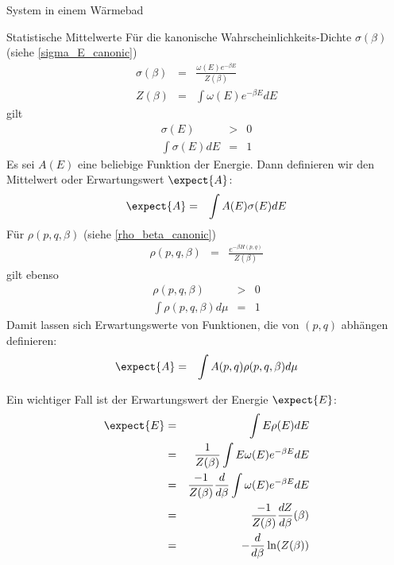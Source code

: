 \begin{chapter}{\titlestr}
\begin{section}{System in einem Wärmebad}
\begin{subsection}{Statistische Mittelwerte}
Für die kanonische Wahrscheinlichkeits-Dichte $\sigma(\beta)$ (siehe \ref{sigma_E_canonic})
\begin{eqnarray*}
\sigma(\beta)&=& \frac{\omega(E)e^{-\beta E}}{Z(\beta)}\\
Z(\beta) &=& \int\omega(E)e^{-\beta E}dE
\end{eqnarray*}
gilt
\begin{eqnarray*}
\sigma(E) &>& 0\\
\int \sigma(E) dE &=& 1
\end{eqnarray*}
Es sei $A(E)$ eine beliebige Funktion der Energie. Dann definieren wir den Mittelwert oder Erwartungswert
$\expect{A}$:
\begin{eqnarray*}
\expect{A} &=& \int A(E)\sigma(E) dE
\end{eqnarray*}
Für $\rho(p,q,\beta)$ (siehe \ref{rho_beta_canonic})
\begin{eqnarray*}
\rho(p,q,\beta) &=& \frac{e^{-\beta H(p,q)}}{Z(\beta)}
\end{eqnarray*}
gilt ebenso
\begin{eqnarray*}
\rho(p,q,\beta) &>& 0\\
\int \rho(p,q,\beta) d\mu &=& 1
\end{eqnarray*}
Damit lassen sich Erwartungswerte von Funktionen, die von $(p,q)$ abhängen definieren:
\begin{eqnarray*}
\expect{A} &=& \int A(p,q)\rho(p,q,\beta) d\mu
\end{eqnarray*}

Ein wichtiger Fall ist der Erwartungswert der Energie $\expect{E}$:
\begin{eqnarray}
\label{E_expect}
\expect{E} &=& \int E\rho(E) dE\cr
&=&\frac{1}{Z(\beta)}\int E\omega(E)e^{-\beta E}dE\cr
&=&\frac{-1}{Z(\beta)}\frac{d}{d \beta}\int \omega(E)e^{-\beta E}dE\cr
&=&\frac{-1}{Z(\beta)}\frac{dZ}{d \beta}(\beta)\cr
&=&-\frac{d}{d \beta}\ln(Z(\beta))
\end{eqnarray}

\end{subsection}


\end{section}
\end{chapter}
